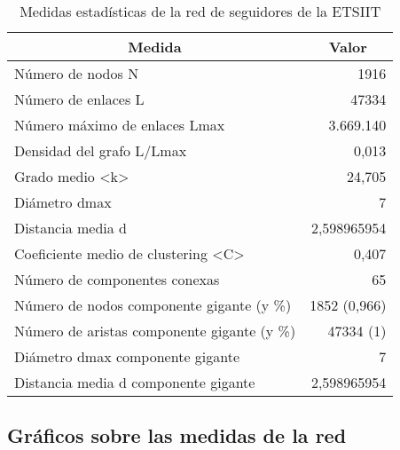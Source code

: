 \begin{table}[H]
\centering
\begin{tabular}{|l|r|}
\hline
\multicolumn{1}{|c|}{\textbf{Medida}}                      & \multicolumn{1}{c|}{\textbf{Valor}} \\ \hline
Número de nodos N                                          & 1916                                \\ \hline
Número de enlaces L                                        & 47334                               \\ \hline
Número máximo de enlaces Lmax                              & 3.669.140                           \\ \hline
Densidad del grafo L/Lmax                                  & 0,013                               \\ \hline
Grado medio \textless{}k\textgreater{}                     & 24,705                              \\ \hline
Diámetro dmax                                              & 7                                   \\ \hline
Distancia media d                                          & 2,598965954                         \\ \hline
Coeficiente medio de clustering \textless{}C\textgreater{} & 0,407                               \\ \hline
Número de componentes conexas                              & 65                                  \\ \hline
Número de nodos componente gigante (y \%)                  & 1852 (0,966)                        \\ \hline
Número de aristas componente gigante (y \%)                & 47334 (1)                           \\ \hline
Diámetro dmax componente gigante                           & 7                                   \\ \hline
Distancia media d componente gigante                       & 2,598965954                         \\ \hline
\end{tabular}%
\caption{Medidas estadísticas de la red de seguidores de la ETSIIT}
\end{table}

\subsection{Gráficos sobre las medidas de la red}
